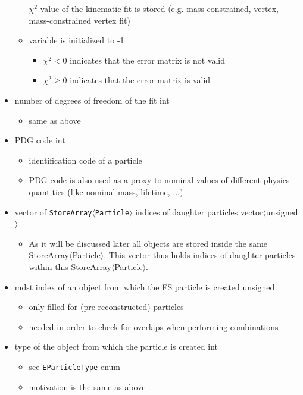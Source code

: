 \begin{itemize}
\begin{itemize}
  $\chi^2$ value of the kinematic fit is stored (e.g. mass-constrained, vertex, mass-constrained vertex fit)
  \item variable is initialized to -1
  \begin{itemize}
   \item $\chi^2<0$ indicates that the error matrix is not valid
   \item $\chi^2\geq 0$ indicates that the error matrix is valid
  \end{itemize}
 \end{itemize}
 \item {\color{blue}number of degrees of freedom of the fit} \hfill{int}
 \begin{itemize}
  \item same as above
 \end{itemize}
 \item {\color{blue} PDG code} \hfill{int}
 \begin{itemize}
  \item identification code of a particle
  \item PDG code is also used as a proxy to nominal values of different physics quantities (like nominal mass, lifetime, ...)
 \end{itemize}
 \item {\color{blue} vector of {\tt StoreArray$\langle$Particle$\rangle$} indices of daughter particles} \hfill{vector$\langle$unsigned$\rangle$}
 \begin{itemize}
  \item As it will be discussed later all \particle objects are stored inside the same StoreArray$\langle$Particle$\rangle$. This vector
  thus holds indices of daughter particles within this StoreArray$\langle$Particle$\rangle$.
 \end{itemize}
 \item {\color{blue} mdst index of an object from which the FS particle is created} \hfill{unsigned}
 \begin{itemize}
  \item only filled for (pre-reconstructed) particles
  \item needed in order to check for overlaps when performing combinations
 \end{itemize}
 \item {\color{blue} type of the \mdst object from which the particle is created } \hfill{int}
 \begin{itemize}
  \item see {\tt EParticleType} enum
  \item motivation is the same as above

\end{itemize}
\end{itemize}
